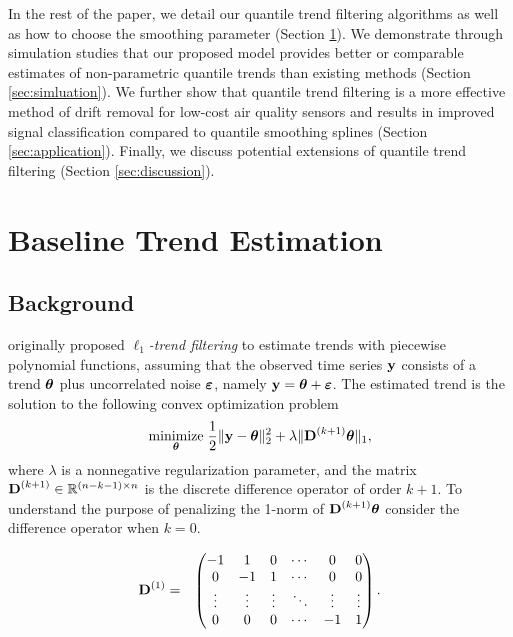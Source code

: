 \documentclass[aoas]{imsart}
\newcommand{\Real}{\mathbb{R}}
\newcommand{\V}[1]{{\bm{\mathbf{\MakeLowercase{#1}}}}} %
\newcommand{\M}[1]{{\bm{\mathbf{\MakeUppercase{#1}}}}} %
\newcommand{\Mn}[2]{\M{#1}^{(#2)}} %
\begin{document}
In the rest of the paper, we detail our quantile trend filtering algorithms as well as how to choose the smoothing parameter (Section \ref{sec:methods}). We demonstrate through simulation studies that our proposed model provides better or comparable estimates of non-parametric quantile trends than existing methods (Section \ref{sec:simluation}). We further show that quantile trend filtering is a more effective method of drift removal for low-cost air quality sensors and results in improved signal classification compared to quantile smoothing splines (Section \ref{sec:application}). Finally, we discuss potential extensions of quantile trend filtering (Section \ref{sec:discussion}).

\section{Baseline Trend Estimation}
\label{sec:methods}

\subsection{Background}

\cite{Kim2009} originally proposed \textit{$\ell_1$-trend filtering} to estimate trends with piecewise polynomial functions, assuming that the observed time series $\V{y}$ consists of a trend $\V{\theta}$ plus uncorrelated noise $\V{\varepsilon}$, namely $\V{y} = \V{\theta} + \V{\varepsilon}$. The estimated trend is the solution to the following convex optimization problem
\begin{eqnarray*}
	\underset{\V{\theta}}{\text{minimize}}\; \frac{1}{2} \lVert \V{y} - \V{\theta} \rVert_2^2 + \lambda \lVert \Mn{D}{k+1}\V{\theta} \rVert_1,
\end{eqnarray*}
where $\lambda$ is a nonnegative regularization parameter, and the matrix $\Mn{D}{k+1} \in \Real^{(n - k -1) \times n}$ is the discrete difference operator of order $k+1$. To understand the purpose of penalizing the 1-norm of $\Mn{D}{k+1}\V{\theta}$ consider the difference operator when $k = 0$.

\begin{eqnarray*}
	\Mn{D}{1} & = & \begin{pmatrix}
		-1 & 1 & 0 & \cdots & 0 & 0 \\
		0 & -1 & 1 & \cdots & 0 & 0 \\
		\vdots & \vdots & \vdots & \ddots & \vdots & \vdots \\
		0 & 0 & 0 & \cdots & -1 & 1 \\
	\end{pmatrix}.
\end{eqnarray*}
\end{document}

